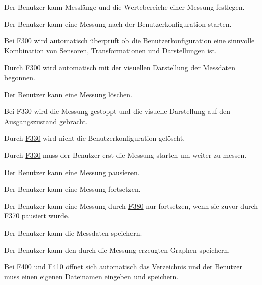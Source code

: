 \documentclass[parskip=full]{scrartcl}
\begin{document}
\begin{description}

\hypertarget{link-f290}{\item[F290]} Der Benutzer kann Messlänge und die Wertebereiche einer Messung festlegen.
\hypertarget{link-f300}{\item[F300]} Der Benutzer kann eine Messung nach der \gls{Benutzerkonfiguration} starten.
\hypertarget{link-f310}{\item[F310]} Bei \hyperlink{link-f300}{F300} wird automatisch überprüft ob die \gls{Benutzerkonfiguration} eine sinnvolle Kombination von Sensoren, Transformationen und Darstellungen ist.
\hypertarget{link-f320}{\item[F320]} Durch \hyperlink{link-f300}{F300} wird automatisch mit der visuellen Darstellung der Messdaten begonnen.
\hypertarget{link-f330}{\item[F330]} Der Benutzer kann eine Messung löschen.
\hypertarget{link-f340}{\item[F340]} Bei \hyperlink{link-f330}{F330} wird die Messung gestoppt und die visuelle Darstellung auf den Ausgangszustand gebracht.
\hypertarget{link-f350}{\item[F350]} Durch \hyperlink{link-f330}{F330} wird nicht die \gls{Benutzerkonfiguration} gelöscht.
\hypertarget{link-f360}{\item[F360]} Durch \hyperlink{link-f330}{F330} muss der Benutzer erst die Messung starten um weiter zu messen.
\hypertarget{link-f370}{\item[F370]} Der Benutzer kann eine Messung pausieren.
\hypertarget{link-f380}{\item[F380]} Der Benutzer kann eine Messung fortsetzen.
\hypertarget{link-f390}{\item[F390]} Der Benutzer kann eine Messung durch \hyperlink{link-f380}{F380} nur fortsetzen, wenn sie zuvor durch \hyperlink{link-f370}{F370} pausiert wurde.
\hypertarget{link-f400}{\item[F400]} Der Benutzer kann die Messdaten speichern.
\hypertarget{link-f410}{\item[F410]} Der Benutzer kann den durch die Messung erzeugten Graphen speichern.
\hypertarget{link-f420}{\item[F420]} Bei \hyperlink{link-f400}{F400} und \hyperlink{link-f410}{F410} öffnet sich automatisch das Verzeichnis und der Benutzer muss einen eigenen Dateinamen eingeben und speichern. 

\end{description}
\end{document}

